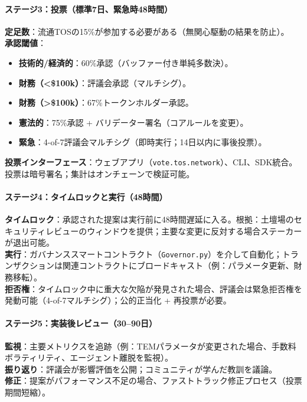 \documentclass[11pt]{article}
\begin{document}
\paragraph{ステージ3：投票（標準7日、緊急時48時間）}
\textbf{定足数}：流通TOSの15\%が参加する必要がある（無関心駆動の結果を防止）。\\
\textbf{承認閾値}：
\begin{itemize}[noitemsep]
  \item \textbf{技術的/経済的}：60\%承認（バッファー付き単純多数決）。
  \item \textbf{財務（<\$100k）}：評議会承認（マルチシグ）。
  \item \textbf{財務（>\$100k）}：67\%トークンホルダー承認。
  \item \textbf{憲法的}：75\%承認 + バリデーター署名（コアルールを変更）。
  \item \textbf{緊急}：4-of-7評議会マルチシグ（即時実行；14日以内に事後投票）。
\end{itemize}
\textbf{投票インターフェース}：ウェブアプリ（\texttt{vote.tos.network}）、CLI、SDK統合。投票は暗号署名；集計はオンチェーンで検証可能。

\paragraph{ステージ4：タイムロックと実行（48時間）}
\textbf{タイムロック}：承認された提案は実行前に48時間遅延に入る。根拠：土壇場のセキュリティレビューのウィンドウを提供；主要な変更に反対する場合ステーカーが退出可能。\\
\textbf{実行}：ガバナンススマートコントラクト（\texttt{Governor.py}）を介して自動化；トランザクションは関連コントラクトにブロードキャスト（例：パラメータ更新、財務移転）。\\
\textbf{拒否権}：タイムロック中に重大な欠陥が発見された場合、評議会は緊急拒否権を発動可能（4-of-7マルチシグ）；公的正当化 + 再投票が必要。

\paragraph{ステージ5：実装後レビュー（30--90日）}
\textbf{監視}：主要メトリクスを追跡（例：TEMパラメータが変更された場合、手数料ボラティリティ、エージェント離脱を監視）。\\
\textbf{振り返り}：評議会が影響評価を公開；コミュニティが学んだ教訓を議論。\\
\textbf{修正}：提案がパフォーマンス不足の場合、ファストトラック修正プロセス（投票期間短縮）。
\end{document}
